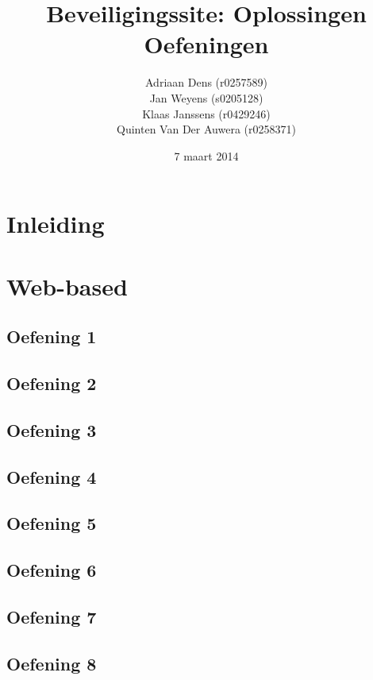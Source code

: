 \documentclass[a4paper,11pt]{report}
\begin{document}
\title{Beveiligingssite: Oplossingen Oefeningen}
\date{7 maart 2014}
\author{Adriaan Dens (r0257589)\\
	Jan Weyens (s0205128)\\
	Klaas Janssens (r0429246)\\
	Quinten Van Der Auwera (r0258371)
}	

\maketitle

\tableofcontents

\chapter{Inleiding}

\newpage

\chapter{Web-based}
\section{Oefening 1}

\section{Oefening 2}

\section{Oefening 3}

\section{Oefening 4}

\section{Oefening 5}

\section{Oefening 6}

\section{Oefening 7}

\section{Oefening 8}

\end{document}

